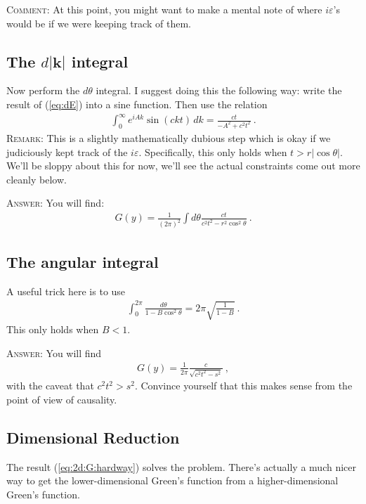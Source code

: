 \documentclass[12pt]{article}
\numberwithin{equation}{section}    %
\renewcommand{\vec}[1]{\mathbf{#1}} %
\begin{document}
\textsc{Comment}: At this point, you might want to make a mental note of where $i\varepsilon$'s would be if we were keeping track of them.

\subsection{The $d|\vec k|$ integral}

Now perform the $d\theta$ integral. I suggest doing this the following way: write the result of (\ref{eq:dE}) into a sine function. Then use the relation
\begin{align}
	\int_0^\infty e^{iAk}\sin(ckt)\, dk = \frac{ct}{-A^2 + c^2t^2} \ .
\end{align}
\textsc{Remark:} This is a slightly mathematically dubious step which is okay if we judiciously kept track of the $i\varepsilon$. Specifically, this only holds when $t > r|\cos\theta|$. We'll be sloppy about this for now, we'll see the actual constraints come out more cleanly below.

\textsc{Answer}: You will find:
\begin{align}
	G(y) = \frac{1}{(2\pi)^2} \int d\theta \frac{ct}{c^2t^2 - r^2\cos^2\theta} \ .
\end{align}

\subsection{The angular integral}

A useful trick here is to use
\begin{align}
	\int_0^{2\pi} \frac{d\theta}{1-B\cos^2\theta} = 2\pi \sqrt{\frac{1}{1-B}} \ .
\end{align}
This only holds when $B<1$. 

\textsc{Answer}: You will find
\begin{align}
	G(y) = \frac{1}{2\pi} \frac{c}{\sqrt{c^2 t^2 - s^2}} \ ,
	\label{eq:2d:G:hardway}
\end{align}
with the caveat that $c^2t^2 > s^2$. Convince yourself that this makes sense from the point of view of causality.


\subsection{Dimensional Reduction}


The result (\ref{eq:2d:G:hardway}) solves the problem. 
%
There's actually a much nicer way to get the lower-dimensional Green's function from a higher-dimensional Green's function. 
\end{document}
